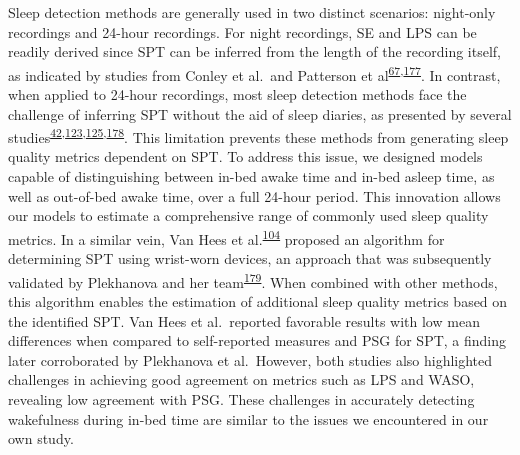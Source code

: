 \documentclass[
  10pt,
]{scrbook}
\begin{document}
Sleep detection methods are generally used in two distinct scenarios:
night-only recordings and 24-hour recordings. For night recordings, SE
and LPS can be readily derived since SPT can be inferred from the length
of the recording itself, as indicated by studies from Conley et al.~and
Patterson et
al\textsuperscript{\protect\hyperlink{ref-conley_agreement_2019}{67},\protect\hyperlink{ref-patterson_40_2023}{177}}.
In contrast, when applied to 24-hour recordings, most sleep detection
methods face the challenge of inferring SPT without the aid of sleep
diaries, as presented by several
studies\textsuperscript{\protect\hyperlink{ref-girschik_validation_2012}{42},\protect\hyperlink{ref-doherty_large_2017}{123},\protect\hyperlink{ref-anderson_assessment_2014}{125},\protect\hyperlink{ref-dozydave2023snooze}{178}}.
This limitation prevents these methods from generating sleep quality
metrics dependent on SPT. To address this issue, we designed models
capable of distinguishing between in-bed awake time and in-bed asleep
time, as well as out-of-bed awake time, over a full 24-hour period. This
innovation allows our models to estimate a comprehensive range of
commonly used sleep quality metrics. In a similar vein, Van Hees et
al.\textsuperscript{\protect\hyperlink{ref-van_hees_estimating_2018}{104}}
proposed an algorithm for determining SPT using wrist-worn devices, an
approach that was subsequently validated by Plekhanova and her
team\textsuperscript{\protect\hyperlink{ref-plekhanova_validation_2023}{179}}.
When combined with other methods, this algorithm enables the estimation
of additional sleep quality metrics based on the identified SPT. Van
Hees et al.~reported favorable results with low mean differences when
compared to self-reported measures and PSG for SPT, a finding later
corroborated by Plekhanova et al.~However, both studies also highlighted
challenges in achieving good agreement on metrics such as LPS and WASO,
revealing low agreement with PSG. These challenges in accurately
detecting wakefulness during in-bed time are similar to the issues we
encountered in our own study.
\end{document}

